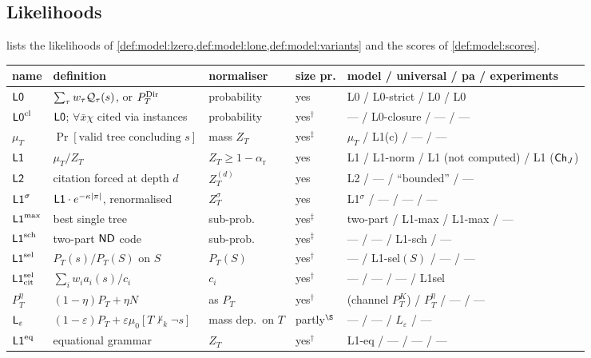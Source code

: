 \subsection{Likelihoods}\label{app:model:lik}

 lists the likelihoods of \cref{def:model:lzero,def:model:lone,def:model:variants} and the scores of \cref{def:model:scores}.

\begin{table}[ht]
\centering\footnotesize\setlength{\tabcolsep}{4pt}
\begin{tabularx}{\textwidth}{@{}lXllp{4.6cm}@{}}
\toprule
name & definition & normaliser & size pr. & model / universal / pa / experiments\\
\midrule
$\mathord{\mathsf{L0}}$ & $\sum_\tau w_\tau\mathcal{Q}_\tau(s)$, or $P^{\mathrm{Dir}}_{T}$ & probability & yes & L0 / L0-strict / L0 / L0\\
$\mathord{\mathsf{L0}}^{\mathrm{cl}}$ & $\mathord{\mathsf{L0}}$; $\forall\bar x\chi$ cited via instances & probability & yes$^\dagger$ & --- / L0-closure / --- / ---\\
$\mu_T$ & $\Pr[\text{valid tree concluding }s]$ & mass $Z_T$ & yes$^\ddagger$ & $\mu_T$ / L1(c) / --- / ---\\
$\mathord{\mathsf{L1}}$ & $\mu_T/Z_T$ & $Z_T\ge1-\alpha_{\mathrm r}$ & yes & L1 / L1-norm / L1 (not computed) / L1 ($\mathsf{Ch}_{J}$)\\
$\mathord{\mathsf{L2}}$ & citation forced at depth $d$ & $Z^{(d)}_T$ & yes & L2 / --- / ``bounded'' / ---\\
$\mathord{\mathsf{L1}}^{\sigma}$ & $\mathord{\mathsf{L1}}\cdot e^{-\kappa|\pi|}$, renormalised & $Z^\sigma_T$ & yes & L1$^\sigma$ / --- / --- / ---\\
$\mathord{\mathsf{L1}}^{\max}$ & best single tree & sub-prob. & yes$^\ddagger$ & two-part / L1-max / L1-max / ---\\
$\mathord{\mathsf{L1}}^{\mathrm{sch}}$ & two-part $\mathsf{ND}$ code & sub-prob. & yes$^\ddagger$ & --- / --- / L1-sch / ---\\
$\mathord{\mathsf{L1}}^{\mathrm{sel}}$ & $P_T(s)/P_T(S)$ on $S$ & $P_T(S)$ & yes$^\dagger$ & --- / L1-sel$(S)$ / --- / ---\\
$\mathord{\mathsf{L1}}^{\mathrm{sel}}_{\mathrm{cit}}$ & $\sum_iw_ia_i(s)/c_i$ & $c_i$ & yes$^\dagger$ & --- / --- / --- / L1sel\\
$P^\eta_T$ & $(1-\eta)P_T+\eta N$ & as $P_T$ & yes$^\dagger$ & (channel $P^K_T$) / $P^\eta_T$ / --- / ---\\
$\mathsf{L}_{\varepsilon}$ & $(1-\varepsilon)P_T+\varepsilon\mu_0[T\nvdash_k\neg s]$ & mass dep.\ on $T$ & partly$^\S$ & --- / --- / $L_\varepsilon$ / ---\\
$\mathord{\mathsf{L1}}^{\mathrm{eq}}$ & equational grammar & $Z_T$ & yes$^\dagger$ & L1-eq / --- / --- / ---\\

\end{tabularx}
\end{table}
